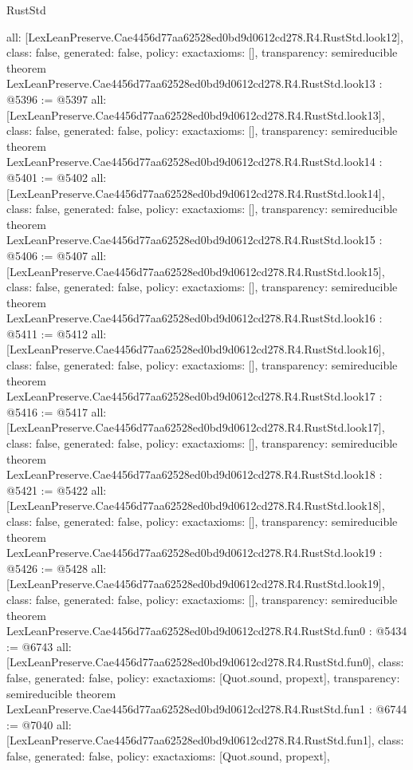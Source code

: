 \begin{lexlean}{RustStd}
\begin{coremodule}
{  all: [LexLeanPreserve.Cae4456d77aa62528ed0bd9d0612cd278.R4.RustStd.look12],
  class: false,
  generated: false,
  policy: exact{axioms: []},
  transparency: semireducible
}
theorem LexLeanPreserve.Cae4456d77aa62528ed0bd9d0612cd278.R4.RustStd.look13 : @5396 := @5397 {
  all: [LexLeanPreserve.Cae4456d77aa62528ed0bd9d0612cd278.R4.RustStd.look13],
  class: false,
  generated: false,
  policy: exact{axioms: []},
  transparency: semireducible
}
theorem LexLeanPreserve.Cae4456d77aa62528ed0bd9d0612cd278.R4.RustStd.look14 : @5401 := @5402 {
  all: [LexLeanPreserve.Cae4456d77aa62528ed0bd9d0612cd278.R4.RustStd.look14],
  class: false,
  generated: false,
  policy: exact{axioms: []},
  transparency: semireducible
}
theorem LexLeanPreserve.Cae4456d77aa62528ed0bd9d0612cd278.R4.RustStd.look15 : @5406 := @5407 {
  all: [LexLeanPreserve.Cae4456d77aa62528ed0bd9d0612cd278.R4.RustStd.look15],
  class: false,
  generated: false,
  policy: exact{axioms: []},
  transparency: semireducible
}
theorem LexLeanPreserve.Cae4456d77aa62528ed0bd9d0612cd278.R4.RustStd.look16 : @5411 := @5412 {
  all: [LexLeanPreserve.Cae4456d77aa62528ed0bd9d0612cd278.R4.RustStd.look16],
  class: false,
  generated: false,
  policy: exact{axioms: []},
  transparency: semireducible
}
theorem LexLeanPreserve.Cae4456d77aa62528ed0bd9d0612cd278.R4.RustStd.look17 : @5416 := @5417 {
  all: [LexLeanPreserve.Cae4456d77aa62528ed0bd9d0612cd278.R4.RustStd.look17],
  class: false,
  generated: false,
  policy: exact{axioms: []},
  transparency: semireducible
}
theorem LexLeanPreserve.Cae4456d77aa62528ed0bd9d0612cd278.R4.RustStd.look18 : @5421 := @5422 {
  all: [LexLeanPreserve.Cae4456d77aa62528ed0bd9d0612cd278.R4.RustStd.look18],
  class: false,
  generated: false,
  policy: exact{axioms: []},
  transparency: semireducible
}
theorem LexLeanPreserve.Cae4456d77aa62528ed0bd9d0612cd278.R4.RustStd.look19 : @5426 := @5428 {
  all: [LexLeanPreserve.Cae4456d77aa62528ed0bd9d0612cd278.R4.RustStd.look19],
  class: false,
  generated: false,
  policy: exact{axioms: []},
  transparency: semireducible
}
theorem LexLeanPreserve.Cae4456d77aa62528ed0bd9d0612cd278.R4.RustStd.fun0 : @5434 := @6743 {
  all: [LexLeanPreserve.Cae4456d77aa62528ed0bd9d0612cd278.R4.RustStd.fun0],
  class: false,
  generated: false,
  policy: exact{axioms: [Quot.sound, propext]},
  transparency: semireducible
}
theorem LexLeanPreserve.Cae4456d77aa62528ed0bd9d0612cd278.R4.RustStd.fun1 : @6744 := @7040 {
  all: [LexLeanPreserve.Cae4456d77aa62528ed0bd9d0612cd278.R4.RustStd.fun1],
  class: false,
  generated: false,
  policy: exact{axioms: [Quot.sound, propext]},
}
\end{coremodule}
\end{lexlean}
